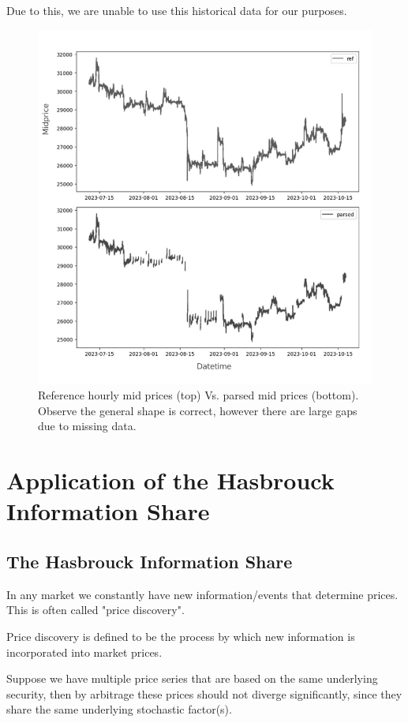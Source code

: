 \documentclass[a4paper, oneside, notitlepage]{book}
\begin{document}
Due to this, we are unable to use this historical data for our purposes.


\begin{figure}[htpb]
    \centering
    \includegraphics[width=1.0\textwidth]{./images/parsed.png}
    \caption{Reference hourly mid prices (top) Vs. parsed mid prices (bottom). Observe the general shape is correct, however
    there are large gaps due to missing data.}
    \label{missing}
\end{figure}

\chapter{Application of the Hasbrouck Information Share}

\section{The Hasbrouck Information Share}
In any market we constantly have new information/events that determine prices. This is often called "price discovery".

Price discovery is defined to be the process by which new information is incorporated into
market prices.

Suppose we have multiple price series that are based on the same underlying security, then by arbitrage these prices should not diverge significantly, since they share the same underlying stochastic factor(s).
\end{document}
